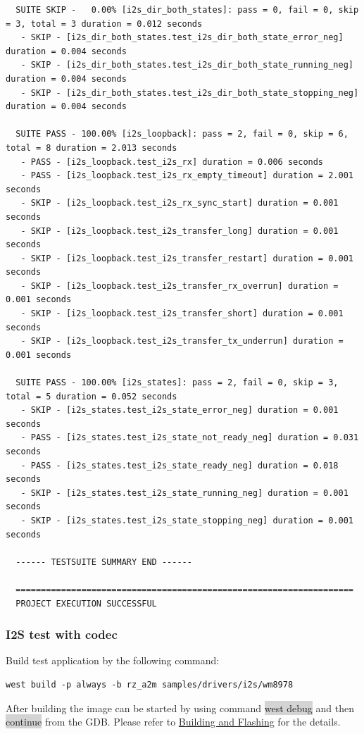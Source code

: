 \documentclass[11pt,a4paper,oneside]{article}
\begin{document}
\begin{lstlisting}
  SUITE SKIP -   0.00% [i2s_dir_both_states]: pass = 0, fail = 0, skip = 3, total = 3 duration = 0.012 seconds
   - SKIP - [i2s_dir_both_states.test_i2s_dir_both_state_error_neg] duration = 0.004 seconds
   - SKIP - [i2s_dir_both_states.test_i2s_dir_both_state_running_neg] duration = 0.004 seconds
   - SKIP - [i2s_dir_both_states.test_i2s_dir_both_state_stopping_neg] duration = 0.004 seconds

  SUITE PASS - 100.00% [i2s_loopback]: pass = 2, fail = 0, skip = 6, total = 8 duration = 2.013 seconds
   - PASS - [i2s_loopback.test_i2s_rx] duration = 0.006 seconds
   - PASS - [i2s_loopback.test_i2s_rx_empty_timeout] duration = 2.001 seconds
   - SKIP - [i2s_loopback.test_i2s_rx_sync_start] duration = 0.001 seconds
   - SKIP - [i2s_loopback.test_i2s_transfer_long] duration = 0.001 seconds
   - SKIP - [i2s_loopback.test_i2s_transfer_restart] duration = 0.001 seconds
   - SKIP - [i2s_loopback.test_i2s_transfer_rx_overrun] duration = 0.001 seconds
   - SKIP - [i2s_loopback.test_i2s_transfer_short] duration = 0.001 seconds
   - SKIP - [i2s_loopback.test_i2s_transfer_tx_underrun] duration = 0.001 seconds

  SUITE PASS - 100.00% [i2s_states]: pass = 2, fail = 0, skip = 3, total = 5 duration = 0.052 seconds
   - SKIP - [i2s_states.test_i2s_state_error_neg] duration = 0.001 seconds
   - PASS - [i2s_states.test_i2s_state_not_ready_neg] duration = 0.031 seconds
   - PASS - [i2s_states.test_i2s_state_ready_neg] duration = 0.018 seconds
   - SKIP - [i2s_states.test_i2s_state_running_neg] duration = 0.001 seconds
   - SKIP - [i2s_states.test_i2s_state_stopping_neg] duration = 0.001 seconds

  ------ TESTSUITE SUMMARY END ------

  ===================================================================
  PROJECT EXECUTION SUCCESSFUL
\end{lstlisting}

\subsubsection{I2S test with codec}\label{i2s-codec-test}

Build test application by the following command:
\begin{lstlisting}
west build -p always -b rz_a2m samples/drivers/i2s/wm8978
\end{lstlisting}

After building the image can be started by using command \colorbox{lightgray}{west debug}
and then \colorbox{lightgray}{continue} from the GDB. Please refer to
\hyperref[building-and-flashing]{Building and Flashing} for the details.
\end{document}
